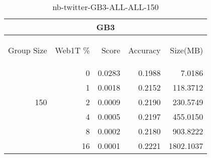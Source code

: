 \begin{center}
\begin{table}[htbp]
\begin{tabular}{ | r | r | r | r | r |}
\hline
\multicolumn{5}{|c|}{GB3}\\
\hline
\begin{sideways}Group Size\end{sideways} & \begin{sideways}Web1T \%\end{sideways} & \begin{sideways}Score\end{sideways} & \begin{sideways}Accuracy\end{sideways} & \begin{sideways}Size(MB)\end{sideways}\\
\hline
\multirow{5}{*}{150}
 & 0 & 0.0283 & 0.1988 & 7.0186\\ \cline{2-5}
 & 1 & 0.0018 & 0.2152 & 118.3712\\ \cline{2-5}
 & 2 & 0.0009 & 0.2190 & 230.5749\\ \cline{2-5}
 & 4 & 0.0005 & 0.2197 & 455.0150\\ \cline{2-5}
 & 8 & 0.0002 & 0.2180 & 903.8222\\ \cline{2-5}
 & 16 & 0.0001 & 0.2221 & 1802.1037\\ \cline{2-5}
\hline
\end{tabular}
\caption{nb-twitter-GB3-ALL-ALL-150}
\label{table:nb-twitter-GB3-ALL-ALL-150}
\end{table}
\end{center}

